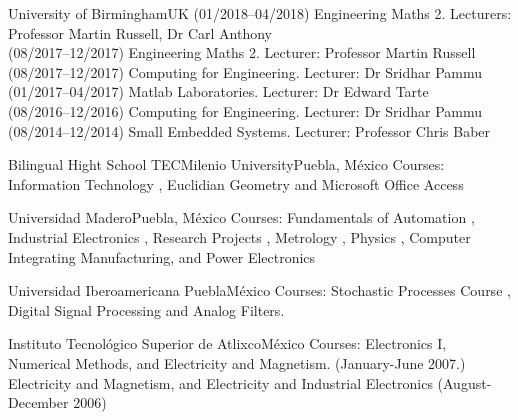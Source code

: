 \documentclass[10pt,a4paper,roman]{moderncv}
\begin{document}
{University of Birmingham}{UK}{}
{
(01/2018--04/2018) Engineering Maths 2. Lecturers: Professor Martin Russell, Dr Carl Anthony \\
(08/2017--12/2017) Engineering Maths 2. Lecturer: Professor Martin Russell \\
(08/2017--12/2017) Computing for Engineering. Lecturer: Dr Sridhar Pammu \\
(01/2017--04/2017) Matlab Laboratories. Lecturer: Dr Edward Tarte \\
(08/2016--12/2016) Computing for Engineering. Lecturer: Dr Sridhar Pammu \\
(08/2014--12/2014) Small Embedded Systems. Lecturer: Professor Chris Baber
}

{Bilingual Hight School TECMilenio University}{Puebla, M\'exico}{}
{Courses:
Information Technology \href{https://sites.google.com/site/perezxochicale/teaching/iit}{\faExternalLink},
Euclidian Geometry  \href{https://sites.google.com/site/perezxochicale/teaching/euclidean-geometry}{\faExternalLink}
and
Microsoft Office Access \href{https://sites.google.com/site/perezxochicale/teaching/moa}{\faExternalLink}
}

{Universidad Madero}{Puebla, M\'exico}{}
{Courses: Fundamentals of Automation
\href{https://sites.google.com/site/perezxochicale/digital-electronics}{\faExternalLink},
Industrial Electronics \href{https://sites.google.com/site/perezxochicale/ie}{\faExternalLink},
Research Projects \href{https://sites.google.com/site/perezxochicale/latex/thesistemplate}{\faExternalLink},
Metrology \href{https://sites.google.com/site/perezxochicale/metrology}{\faExternalLink},
Physics \href{http://goo.gl/fffnG}{\faExternalLink},
Computer Integrating Manufacturing, and Power Electronics
}

{Universidad Iberoamericana Puebla}{M\'exico}{}
{Courses: Stochastic Processes Course
\href{https://sites.google.com/site/perezxochicale/stochastic-processes-course}{\faExternalLink},
Digital Signal Processing
\href{https://sites.google.com/site/perezxochicale/digital-signal-processing-course}{\faExternalLink}
and Analog Filters.
}

{Instituto Tecnol\'ogico Superior de Atlixco}{M\'exico}{}
{Courses: Electronics I, Numerical Methods, and Electricity and Magnetism. (January-June 2007.)
Electricity and Magnetism, and Electricity and Industrial Electronics (August-December 2006)
}
\end{document}

